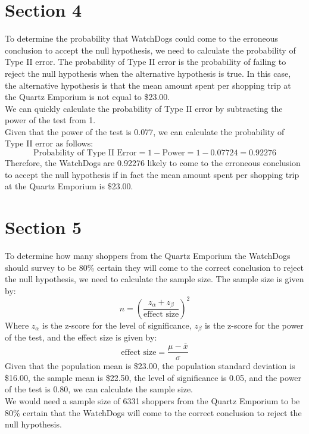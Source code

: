 \documentclass{article}
\begin{document}
\section{Section 4}
To determine the probability that WatchDogs could come to the erroneous conclusion to accept the null hypothesis, we need to calculate the probability of Type II error. The probability of Type II error is the probability of failing to reject the null hypothesis when the alternative hypothesis is true. In this case, the alternative hypothesis is that the mean amount spent per shopping trip at the Quartz Emporium is not equal to \$23.00.\\
We can quickly calculate the probability of Type II error by subtracting the power of the test from 1.\\
Given that the power of the test is 0.077, we can calculate the probability of Type II error as follows:
\begin{equation}
    \text{Probability of Type II Error} = 1 - \text{Power} = 1 - 0.07724 = 0.92276
\end{equation}
Therefore, the WatchDogs are 0.92276 likely to come to the erroneous conclusion to accept the null hypothesis if in fact the mean amount spent per shopping trip at the Quartz Emporium is \$23.00.

\section{Section 5}
To determine how many shoppers from the Quartz Emporium the WatchDogs should survey to be 80\% certain they will come to the correct conclusion to reject the null hypothesis, we need to calculate the sample size. The sample size is given by:
\begin{equation}
    n = \left( \frac{z_{\alpha} + z_{\beta}}{\text{effect size}} \right)^2
\end{equation}
Where $z_{\alpha}$ is the z-score for the level of significance, $z_{\beta}$ is the z-score for the power of the test, and the effect size is given by:
\begin{equation}
    \text{effect size} = \frac{\mu - \bar{x}}{\sigma}
\end{equation}
Given that the population mean is \$23.00, the population standard deviation is \$16.00, the sample mean is \$22.50, the level of significance is 0.05, and the power of the test is 0.80, we can calculate the sample size.\\
We would need a sample size of 6331 shoppers from the Quartz Emporium to be 80\% certain that the WatchDogs will come to the correct conclusion to reject the null hypothesis.
\end{document}
